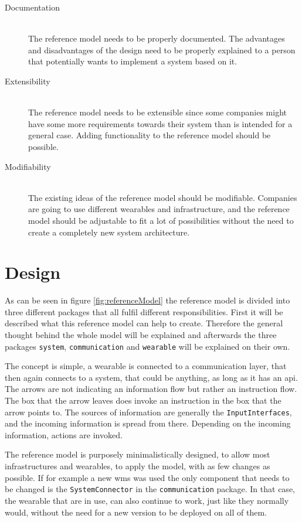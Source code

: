 \begin{description}
	\item[Documentation] \hfill \\
		The reference model needs to be properly documented. The advantages and disadvantages of the design need to be properly explained to a person that potentially wants to implement a system based on it.
	\item[Extensibility] \hfill \\
		The reference model needs to be extensible since some companies might have some more requirements towards their system than is intended for a general case. Adding functionality to the reference model should be possible.
	\item[Modifiability] \hfill \\
		The existing ideas of the reference model should be modifiable. Companies are going to use different wearables and infrastructure, and the reference model should be adjustable to fit a lot of possibilities without the need to create a completely new system architecture.
\end{description}

\section{Design}
As can be seen in figure \ref{fig:referenceModel} the \gls{reference model} is divided into three different packages that all fulfil different responsibilities. First it will be described what this \gls{reference model} can help to create. Therefore the general thought behind the whole model will be explained and afterwards the three packages \texttt{system}, \texttt{communication} and \texttt{wearable} will be explained on their own.

The concept is simple, a wearable is connected to a communication layer, that then again connects to a system, that could be anything, as long as it has an \gls{api}. The arrows are not indicating an information flow but rather an instruction flow. The box that the arrow leaves does invoke an instruction in the box that the arrow points to. The sources of information are generally the \texttt{InputInterfaces}, and the incoming information is spread from there. Depending on the incoming information, actions are invoked. 

The \gls{reference model} is purposely minimalistically designed, to allow most infrastructures and wearables, to apply the model, with as few changes as possible. If for example a new \gls{wms} was used the only component that needs to be changed is the \texttt{SystemConnector} in the \texttt{communication} package. In that case, the wearable that are in use, can also continue to work, just like they normally would, without the need for a new version to be deployed on all of them.

